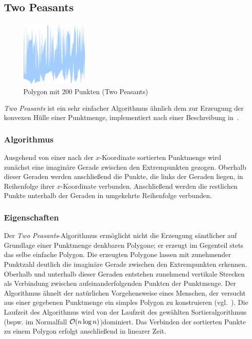 \subsection{Two Peasants}

  \begin{figure}[h]
    \begin{center}
      \includegraphics[width=0.3\textwidth]{img/twopeasants200.eps}
    \end{center}
    \caption{Polygon mit 200 Punkten (Two Peasants)}
    \label{fig:twopeasants200}
  \end{figure}

  \emph{Two Peasants} ist ein sehr einfacher Algorithmus ähnlich dem
  zur Erzeugung der konvexen Hülle einer Punktmenge, implementiert nach einer
  Beschreibung in~\cite{geometrylab}.

  \subsubsection{Algorithmus}

    Ausgehend von einer nach der $x$-Koordinate sortierten Punktmenge wird
    zunächst eine imaginäre Gerade zwischen den Extrempunkten gezogen.
    Oberhalb dieser Geraden werden anschließend die Punkte, die links der
    Geraden liegen, in Reihenfolge ihrer $x$-Koordinate verbunden.
    Anschließend werden die restlichen Punkte unterhalb der Geraden in
    umgekehrte Reihenfolge verbunden.

  \subsubsection{Eigenschaften}

  Der \emph{Two Peasants}-Algorithmus ermöglicht nicht die Erzeugung sämtlicher
  auf Grundlage einer Punktmenge denkbaren Polygone; er erzeugt im Gegenteil
  stets das selbe einfache Polygon. Die erzeugten Polygone lassen mit
  zunehmender Punktzahl deutlich die imaginäre Gerade zwischen den Extrempunkten
  erkennen. Oberhalb und unterhalb dieser Geraden entstehen zunehmend vertikale
  Strecken als Verbindung zwischen aufeinanderfolgenden Punkten der Punktmenge.
  Der Algorithmus ähnelt der natürlichen Vorgehensweise eines Menschen, der
  versucht aus einer gegebenen Punktmenge ein simples Polygon zu konstruieren
  (vgl.~\cite{geometrylab}). Die Laufzeit des Algorithmus wird von der
  Laufzeit des gewählten Sortieralgorithmus (bspw. im Normalfall $\mathcal{O}(n \log
  n)$)dominiert. Das Verbinden der sortierten Punkte zu einem Polygon erfolgt
  anschließend in linearer Zeit.
